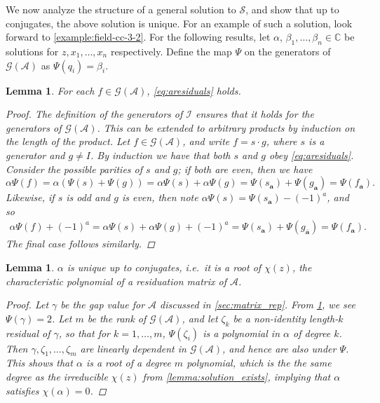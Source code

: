 \documentclass[12pt, letterpaper]{article}
\newcommand{\C}{\mathbb C}
\newcommand{\A}{\mathcal A}
\newcommand{\ch}[1]{\mathbf{#1}}
\newcommand{\res}[2]{{{#1}_{\ch{#2}}}}
\newcommand{\I}{\mathcal I}
\renewcommand{\S}{\mathcal S}
\newcommand{\gp}{\mathcal G}
\newcommand{\f}[1]{\overline{#1}}
\newtheorem{lemma}[thm]{Lemma}
\begin{document}
We now analyze the structure of a general solution to $\S$, and show that up to
conjugates, the above solution is unique. For an example of such a solution,
look forward to \cref{example:field-cc-3-2}.  For the following results, let
$\alpha$, $\beta_1, \ldots, \beta_n \in \C$ be solutions for $z, x_1, \ldots,
x_n$ respectively. Define the map $\Psi$ on the generators of $\gp(\A)$ as
$\Psi(q_i) = \beta_i$.

\begin{lemma}\label{lemma:residuation}
    For each $f \in \gp(\A)$, \cref{eq:aresiduals} holds.
    \begin{proof}
        The definition of the generators of $\I$ ensures that it holds for the
        generators of $\gp(\A)$. This can be extended to arbitrary products by
        induction on the length of the product. Let $f \in \gp(\A)$, and write
        $f = s \cdot g$, where $s$ is a generator and $g \ne I$. By induction
        we have that both $s$ and $g$ obey \cref{eq:aresiduals}.  Consider the
        possible parities of $s$ and $g$; if both are even, then we have
        \[
            \alpha \Psi(f) =
            \alpha (\Psi(s) + \Psi(g)) =
            \alpha \Psi(s) + \alpha \Psi(g) =
            \Psi(\res{s}{a}) + \Psi(\res{g}{a}) = \Psi(\res{f}{a}).
        \]
        Likewise, if $s$ is odd and $g$ is even, then note $\alpha \Psi(s) =
        \Psi(\res{s}{a}) - {(-1)}^a$, and so
        \begin{align*}
            \alpha \Psi(f) + {(-1)}^a =
            \alpha \Psi(s) + \alpha \Psi(g) + {(-1)}^a =
            \Psi(\res{s}{a}) + \Psi(\res{g}{\f{a}}) =
            \Psi(\res{f}{a}).
        \end{align*}
        The final case follows similarly.
    \end{proof}
\end{lemma}


\begin{lemma}\label{lemma:a_unique}
    $\alpha$ is unique up to conjugates, i.e.\ it is a root of $\chi(z)$, the
    characteristic polynomial of a residuation matrix of $\A$.
    \begin{proof}
        Let $\gamma$ be the gap value for $\A$ discussed in
        \cref{sec:matrix_rep}. From \cref{lemma:residuation}, we see
        $\Psi(\gamma) = 2$. Let $m$ be the rank of $\gp(\A)$, and let
        $\zeta_k$ be a non-identity length-$k$ residual of $\gamma$, so that
        for $k = 1, \ldots, m$, $\Psi(\zeta_i)$ is a polynomial in $\alpha$ of
        degree $k$. Then $\gamma, \zeta_1, \ldots, \zeta_{m}$ are linearly
        dependent in $\gp(\A)$, and hence are also under $\Psi$. This shows
        that $\alpha$ is a root of a degree $m$ polynomial, which is the the
        same degree as the irreducible $\chi(z)$ from
        \cref{lemma:solution_exists}, implying that $\alpha$ satisfies
        $\chi(\alpha) = 0$.
    \end{proof}
\end{lemma}
\end{document}
